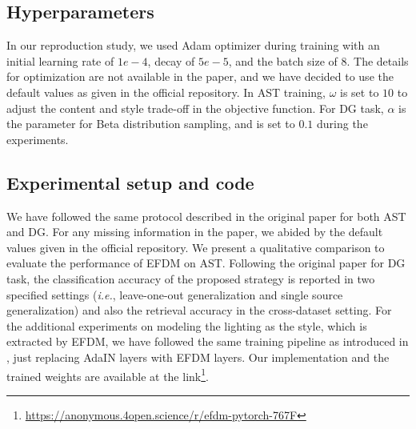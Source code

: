 
\subsection{Hyperparameters}
In our reproduction study, we used Adam optimizer \cite{kingma2014adam} during training with an initial learning rate of $1e-4$, decay of $5e-5$, and the batch size of $8$. The details for optimization are not available in the paper, and we have decided to use the default values as given in the official repository. In AST training, $\omega$ is set to $10$ to adjust the content and style trade-off in the objective function. For DG task, $\alpha$ is the parameter for Beta distribution sampling, and is set to $0.1$ during the experiments.


\subsection{Experimental setup and code}

We have followed the same protocol described in the original paper for both AST and DG. For any missing information in the paper, we abided by the default values given in the official repository. We present a qualitative comparison to evaluate the performance of EFDM on AST. Following the original paper for DG task, the classification accuracy of the proposed strategy is reported in two specified settings (\textit{i.e.}, leave-one-out generalization and single source generalization) and also the retrieval accuracy in the cross-dataset setting. For the additional experiments on modeling the lighting as the style, which is extracted by EFDM, we have followed the same training pipeline as introduced in \cite{kinli2023modeling}, just replacing AdaIN layers with EFDM layers. Our implementation and the trained weights are available at the link\footnote{\url{https://anonymous.4open.science/r/efdm-pytorch-767F}}. %

